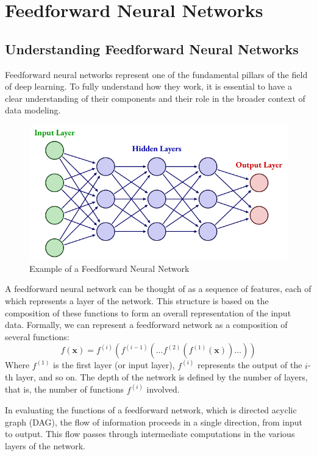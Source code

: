 \section{Feedforward Neural Networks}

\subsection{Understanding Feedforward Neural Networks}

Feedforward neural networks represent one of the fundamental pillars of the field of deep learning. To fully understand how they work, it is essential to have a clear understanding of their components and their role in the broader context of data modeling.

\begin{figure}[!htbp]
    \centering
    \includegraphics[scale=1.4]{tikz/chapter1 - Feedforward Neural Network.pdf}
    \caption{Example of a Feedforward Neural Network}
\end{figure}

A feedforward neural network can be thought of as a sequence of features, each of which represents a layer of the network. This structure is based on the composition of these functions to form an overall representation of the input data. Formally, we can represent a feedforward network as a composition of several functions:
$$ f(\mathbf{x}) = f^{(i)}(f^{(i-1)}(\dots f^{(2)}(f^{(1)}(\mathbf{x})) \dots )) $$  
Where \( f^{(1)} \) is the first layer (or input layer), \( f^{(i)} \) represents the output of the \(i\)-th layer, and so on. The depth of the network is defined by the number of layers, that is, the number of functions \( f^{(i)} \) involved.

In evaluating the functions of a feedforward network, which is directed acyclic graph (DAG), the flow of information proceeds in a single direction, from input to output. This flow passes through intermediate computations in the various layers of the network. 

